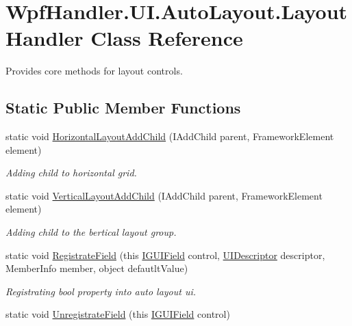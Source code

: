 \hypertarget{class_wpf_handler_1_1_u_i_1_1_auto_layout_1_1_layout_handler}{}\section{Wpf\+Handler.\+U\+I.\+Auto\+Layout.\+Layout\+Handler Class Reference}
\label{class_wpf_handler_1_1_u_i_1_1_auto_layout_1_1_layout_handler}


Provides core methods for layout controls.  


\subsection*{Static Public Member Functions}
\begin{DoxyCompactItemize}
\item 
static void \mbox{\hyperlink{class_wpf_handler_1_1_u_i_1_1_auto_layout_1_1_layout_handler_af450dc0f251144cbdb3c64c4756c8025}{Horizontal\+Layout\+Add\+Child}} (I\+Add\+Child parent, Framework\+Element element)
\begin{DoxyCompactList}\small\item\em Adding child to horizontal grid. \end{DoxyCompactList}\item 
static void \mbox{\hyperlink{class_wpf_handler_1_1_u_i_1_1_auto_layout_1_1_layout_handler_aa974993604b1fe101eccab0fe966170a}{Vertical\+Layout\+Add\+Child}} (I\+Add\+Child parent, Framework\+Element element)
\begin{DoxyCompactList}\small\item\em Adding child to the bertical layout group. \end{DoxyCompactList}\item 
static void \mbox{\hyperlink{class_wpf_handler_1_1_u_i_1_1_auto_layout_1_1_layout_handler_a2ae3e871977ebeaed8c265ccf98e46a9}{Registrate\+Field}} (this \mbox{\hyperlink{interface_wpf_handler_1_1_u_i_1_1_auto_layout_1_1_i_g_u_i_field}{I\+G\+U\+I\+Field}} control, \mbox{\hyperlink{class_wpf_handler_1_1_u_i_1_1_auto_layout_1_1_u_i_descriptor}{U\+I\+Descriptor}} descriptor, Member\+Info member, object defautlt\+Value)
\begin{DoxyCompactList}\small\item\em Registrating bool property into auto layout ui. \end{DoxyCompactList}\item 
static void \mbox{\hyperlink{class_wpf_handler_1_1_u_i_1_1_auto_layout_1_1_layout_handler_a14720e6297e28f2502765ac372f32155}{Unregistrate\+Field}} (this \mbox{\hyperlink{interface_wpf_handler_1_1_u_i_1_1_auto_layout_1_1_i_g_u_i_field}{I\+G\+U\+I\+Field}} control)

\end{DoxyCompactItemize}
